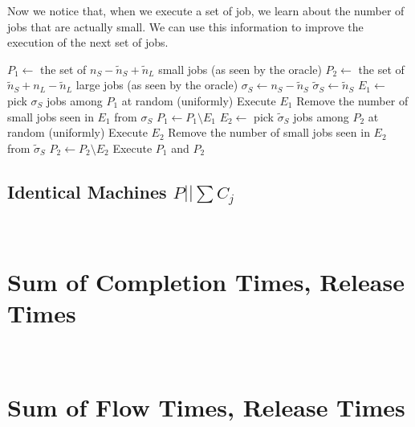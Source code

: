 \documentclass{article}
\newcommand{\definecomment}[3]{%
        \fbox{\bfseries\sffamily\scriptsize #1}%
        ~{\small\textsf{\emph{\color{#3}{#2}}}}}
\newcommand{\definecomment}[3]{}
\newcommand{\ad}[1]{\definecomment{AD}{#1}{red}}
\begin{document}
Now we notice that, when we execute a set of job, we learn about the number of jobs that are
actually small. We can use this information to improve the execution of the next set of jobs.

\begin{algorithm}
    \begin{algorithmic}[1]
        \State \(P_1\gets\) the set of \(n_S-\tilde{n}_S+\tilde{n}_L\) small jobs (as seen by the oracle)
        \State \(P_2\gets\) the set of \(\tilde{n}_S+n_L-\tilde{n}_L\) large jobs (as seen by the oracle)
        \State \(\sigma_S\gets n_S-\tilde{n}_S\)
        \State \(\tilde{\sigma}_S\gets \tilde{n}_S\)
                \State \(E_1\gets\) pick \(\sigma_S\) jobs among \(P_1\) at random (uniformly)
                \State Execute \(E_1\)
                \State Remove the number of small jobs seen in \(E_1\) from \(\sigma_S\)
                \State \(P_1\gets P_1\setminus E_1\)
            \EndIf
                \State \(E_2\gets\) pick \(\tilde{\sigma}_S\) jobs among \(P_2\) at random (uniformly)
                \State Execute \(E_2\)
                \State Remove the number of small jobs seen in \(E_2\) from \(\tilde{\sigma}_S\)
                \State \(P_2\gets P_2\setminus E_2\)
            \EndIf
        \EndWhile
        \State Execute \(P_1\) and \(P_2\)
    \end{algorithmic}
\end{algorithm}

\subsection{Identical Machines \(P||\sum C_j\)}

\ad{TODO}

\section{Sum of Completion Times, Release Times}

\ad{TODO}

\section{Sum of Flow Times, Release Times}

\ad{TODO}

\nocite{*}


\end{document}
